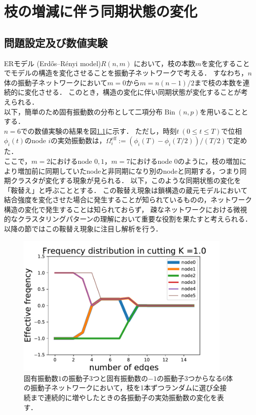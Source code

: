 \documentclass[../main]{subfiles}
\begin{document}
\chapter{枝の増減に伴う同期状態の変化}
\label{chap:method-3body}
\section{問題設定及び数値実験}
\label{sec:method-3body-settting}
ERモデル (Erdős–Rényi model)$R(n,m)$ において，枝の本数$m$を変化することでモデルの構造を変化させることを振動子ネットワークで考える．
すなわち，$n$ 体の振動子ネットワークにおいて$m=0$から$m=n(n-1)/2$まで枝の本数を連続的に変化させる．
このとき，構造の変化に伴い同期状態が変化することが考えられる．\\
以下，簡単のため固有振動数の分布として二項分布$\operatorname{Bin}(n,p)$を用いることとする．\\
$n=6$での数値実験の結果を図\ref{fig:cutting_N6K1}に示す．
ただし，時刻$t\ (0\leq t\leq T)$で位相$\phi_i(t)$のnode $i$の実効振動数は，$\Omega_i^{\mathrm{eff}}:=(\phi_i(T)-\phi_i(T/2))/(T/2)$で定めた．\\
ここで，$m=2$におけるnode $0,1$，$m=7$におけるnode $0$のように，枝の増加により増加前に同期していたnodeと非同期になり別のnodeと同期する，つまり同期クラスタが変化する現象が見られる．
以下，このような同期状態の変化を「鞍替え」と呼ぶこととする．
この鞍替え現象は鎖構造の蔵元モデルにおいて結合強度を変化させた場合に発生することが知られている\cite{XiaHuang:130506}ものの，ネットワーク構造の変化で発生することは知られておらず，
疎なネットワークにおける微視的なクラスタリングパターンの理解において重要な役割を果たすと考えられる．
以降の節ではこの鞍替え現象に注目し解析を行う．
\begin{figure}[t]
\centering
\includegraphics[width=105mm]{./images/cutting_N6K1.pdf}
\centering
\caption{固有振動数$1$の振動子3つと固有振動数の$-1$の振動子3つからなる6体の振動子ネットワークにおいて，枝を1本ずつランダムに選び全接続まで連続的に増やしたときの各振動子の実効振動数の変化を表す．}
\label{fig:cutting_N6K1}
\end{figure}
\end{document}
